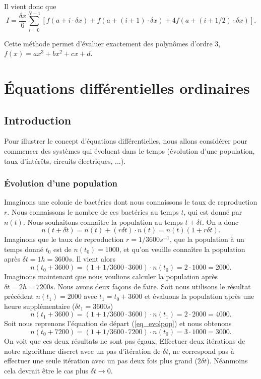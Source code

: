 \documentclass[a4paper,12pt]{book}
\begin{document}
Il vient donc que 
\begin{equation}
 I=\frac{\delta x}{6}\sum_{i=0}^{N-1}\left[f(a+i\cdot \delta x)+f(a+(i+1)\cdot\delta x)+4f(a+(i+1/2)\cdot\delta x)\right].
\end{equation}

Cette méthode permet d'évaluer exactement des polynômes d'ordre 3, $f(x)=ax^3+bx^2+cx+d$.


\chapter{Équations différentielles ordinaires}

\section{Introduction}

Pour illustrer le concept d'équations différentielles, nous allons considérer pour commencer des systèmes
qui évoluent dans le temps (évolution d'une population, taux d'intérêts, circuits électriques, ...).

\subsection{Évolution d'une population}

Imaginons une colonie de bactéries dont nous connaissons le taux de reproduction $r$. Nous connaissons le nombre de
ces bactéries au temps $t$, qui est donné par $n(t)$. Nous souhaitons connaître la population au temps $t+\delta t$.
On a donc
\begin{equation}
 n(t+\delta t)=n(t)+(r\delta t)\cdot n(t)=n(t)(1+r\delta t).\label{eq_evolpop}
\end{equation}
Imaginons que le taux de reproduction $r=1/3600 s^{-1}$, que la population à un temps donné $t_0$ est de $n(t_0)=1000$, et qu'on veuille connaître la population après 
$\delta t=1h=3600s$. Il vient alors
\begin{equation}
 n(t_0+3600)=(1+1/3600 \cdot 3600)\cdot n(t_0)=2\cdot1000=2000.
\end{equation}
Imaginons maintenant que nous voulions calculer la population après $\delta t=2h=7200s$. Nous avons deux façons de faire.
Soit nous utilisons le résultat précédent $n(t_1)=2000$ avec $t_1=t_0+3600$ et évaluons la population après une heure supplémentaire ($\delta t_1=3600s$)
\begin{equation}
 n(t_1+3600)=(1+1/3600 \cdot 3600)\cdot n(t_1)=2\cdot 2000=4000.\label{eq_comp}
\end{equation}
Soit nous reprenons l'équation de départ (\eqref{eq_evolpop}) et nous obtenons
\begin{equation}
 n(t_0+7200)=(1+1/3600 \cdot 7200)\cdot n(t_0)=3\cdot 1000=3000.
\end{equation}
On voit que ces deux résultats ne sont pas égaux. Effectuer deux itérations de notre algorithme discret avec un pas d'itération de $\delta t$,
ne correspond pas à effectuer une seule itération avec un pas deux fois plus grand ($2\delta t$). Néanmoins
cela devrait être le cas plus $\delta t\rightarrow 0$.
\end{document}

